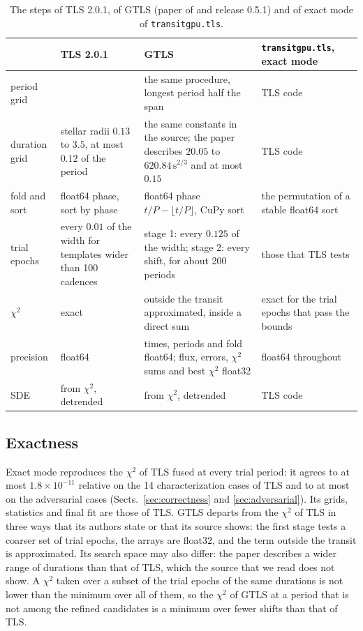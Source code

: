 \documentclass{aastex631}
\begin{document}
\begin{table}[htbp]
\centering
\caption{The steps of TLS 2.0.1, of GTLS (paper of \citealt{Hu2026} and release 0.5.1) and of exact mode of \texttt{transitgpu.tls}.}\label{tab:gtls}
\small
\begin{tabular}{R{2.2cm}R{3.4cm}R{4.2cm}R{4.2cm}}
\toprule
 & TLS 2.0.1 & GTLS & \texttt{transitgpu.tls}, exact mode \\
\midrule
period grid & \citet{Ofir2014} & the same procedure, longest period half the span & TLS code \\
duration grid & stellar radii $0.13$ to $3.5$, at most $0.12$ of the period & the same constants in the source; the paper describes $20.05$ to $620.84\,\mathrm{s}^{2/3}$ and at most $0.15$ & TLS code \\
fold and sort & float64 phase, sort by phase & float64 phase $t/P-\lfloor t/P\rfloor$, CuPy sort & the permutation of a stable float64 sort \\
trial epochs & every $0.01$ of the width for templates wider than 100 cadences & stage 1: every $0.125$ of the width; stage 2: every shift, for about 200 periods & those that TLS tests \\
$\chi^2$ & exact & outside the transit approximated, inside a direct sum & exact for the trial epochs that pass the bounds \\
precision & float64 & times, periods and fold float64; flux, errors, $\chi^2$ sums and best $\chi^2$ float32 & float64 throughout \\
SDE & from $\chi^2$, detrended & from $\chi^2$, detrended \citep[Sect.~2.4]{Hu2026} & TLS code \\
\bottomrule
\end{tabular}
\end{table}

\subsection{Exactness}\label{sec:gtlsexact}
Exact mode reproduces the $\chi^2$ of TLS fused at every trial period: it agrees to at most $1.8\times10^{-11}$ relative on the 14 characterization cases of TLS and to at most  on the adversarial cases (Sects.~\ref{sec:correctness} and \ref{sec:adversarial}). Its grids, statistics and final fit are those of TLS. GTLS departs from the $\chi^2$ of TLS in three ways that its authors state or that its source shows: the first stage tests a coarser set of trial epochs, the arrays are float32, and the term outside the transit is approximated. Its search space may also differ: the paper describes a wider range of durations than that of TLS, which the source that we read does not show. A $\chi^2$ taken over a subset of the trial epochs of the same durations is not lower than the minimum over all of them, so the $\chi^2$ of GTLS at a period that is not among the refined candidates is a minimum over fewer shifts than that of TLS.
\end{document}
